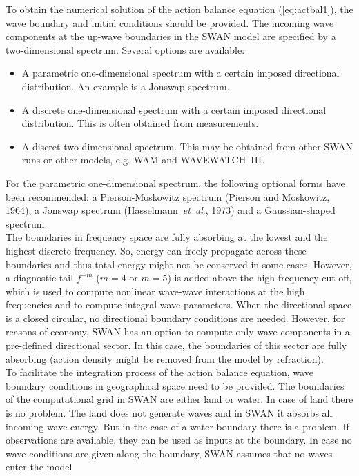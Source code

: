 \documentclass[12pt]{book}
\begin{document}
To obtain the numerical solution of the action balance equation (\ref{eq:actbal1}), the wave boundary
and initial conditions should be provided. The incoming wave components at the up-wave
boundaries in the SWAN model are specified by a two-dimensional spectrum. Several
options are available:
\begin{itemize}
  \item A parametric one-dimensional spectrum with a certain imposed directional distribution.
        An example is a Jonswap spectrum.
  \item A discrete one-dimensional spectrum with a certain imposed directional distribution.
        This is often obtained from measurements.
  \item A discret two-dimensional spectrum. This may be obtained from other SWAN runs or other
        models, e.g. WAM and WAVEWATCH~III.
\end{itemize}
For the parametric one-dimensional spectrum, the following optional forms have been recommended:
a Pierson-Moskowitz spectrum (Pierson and Moskowitz, 1964), a Jonswap spectrum
(Hasselmann~{\it et~al}., 1973) and a Gaussian-shaped spectrum.
\\[2ex]
\noindent
The boundaries in frequency space are fully absorbing at the lowest and the highest discrete
frequency. So, energy can freely propagate across these boundaries and thus total energy
might not be conserved in some cases. However, a diagnostic tail $f^{-m}$ ($m=4$ or $m=5$)
is added above the high frequency cut-off, which is used to compute nonlinear wave-wave
interactions at the high frequencies and to compute integral wave parameters. When the directional
space is a closed circular, no directional boundary conditions are needed. However,
for reasons of economy, SWAN has an option to compute only wave components in a pre-defined
directional sector. In this case, the boundaries of this sector are fully absorbing (action
density might be removed from the model by refraction).
\\[2ex]
\noindent
To facilitate the integration process of the action balance equation, wave boundary conditions
in geographical space need to be provided. The boundaries of the computational grid in SWAN
are either land or water. In case of land there is no problem. The land does not generate waves
and in SWAN it absorbs all incoming wave energy. But in the case of a water boundary there is
a problem. If observations are available, they can be used as inputs at the boundary. In case
no wave conditions are given along the boundary, SWAN assumes that no waves enter the model
\end{document}
